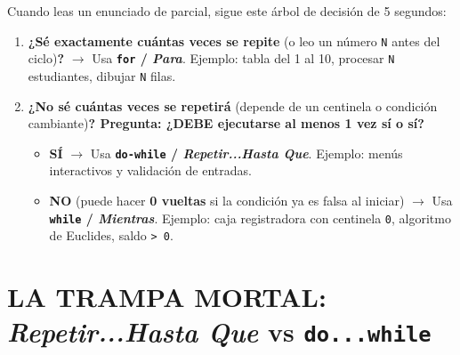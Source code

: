\documentclass[11pt,letterpaper]{article}
\begin{document}
Cuando leas un enunciado de parcial, sigue este árbol de decisión de 5 segundos:
\begin{enumerate}
  \item \textbf{¿Sé exactamente cuántas veces se repite} (o leo un número \texttt{N} antes del ciclo)\textbf{?} $\rightarrow$ Usa \textbf{\texttt{for} / \textit{Para}}. Ejemplo: tabla del 1 al 10, procesar \texttt{N} estudiantes, dibujar \texttt{N} filas.
  \item \textbf{¿No sé cuántas veces se repetirá} (depende de un centinela o condición cambiante)\textbf{? Pregunta: ¿DEBE ejecutarse al menos 1 vez sí o sí?}
  \begin{itemize}
    \item \textbf{SÍ} $\rightarrow$ Usa \textbf{\texttt{do-while} / \textit{Repetir...Hasta Que}}. Ejemplo: menús interactivos y validación de entradas.
    \item \textbf{NO} (puede hacer \textbf{0 vueltas} si la condición ya es falsa al iniciar) $\rightarrow$ Usa \textbf{\texttt{while} / \textit{Mientras}}. Ejemplo: caja registradora con centinela \texttt{0}, algoritmo de Euclides, saldo \texttt{> 0}.
  \end{itemize}
\end{enumerate}


\section{LA TRAMPA MORTAL: \textit{Repetir...Hasta Que} vs \texttt{do...while}}
\end{document}
